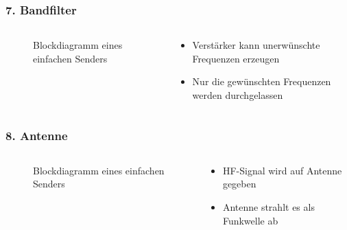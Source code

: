 \begin{frame}
\frametitle{7. Bandfilter}
\begin{columns}
    \begin{column}{0.48\textwidth}
    
\begin{figure}
    \caption{\scriptsize Blockdiagramm eines einfachen Senders}
    \label{aufbau_sender}
\end{figure}


    \end{column}
   \begin{column}{0.48\textwidth}
       \begin{itemize}
  \item Verstärker kann unerwünschte Frequenzen erzeugen
  \item Nur die gewünschten Frequenzen werden durchgelassen
  \end{itemize}

   \end{column}
\end{columns}

\end{frame}

\begin{frame}
\frametitle{8. Antenne}
\begin{columns}
    \begin{column}{0.48\textwidth}
    
\begin{figure}
    \caption{\scriptsize Blockdiagramm eines einfachen Senders}
    \label{aufbau_sender}
\end{figure}


    \end{column}
   \begin{column}{0.48\textwidth}
       \begin{itemize}
  \item HF-Signal wird auf Antenne gegeben
  \item Antenne strahlt es als Funkwelle ab
  \end{itemize}

   \end{column}
\end{columns}

\end{frame}

\begin{frame}
\end{frame}

